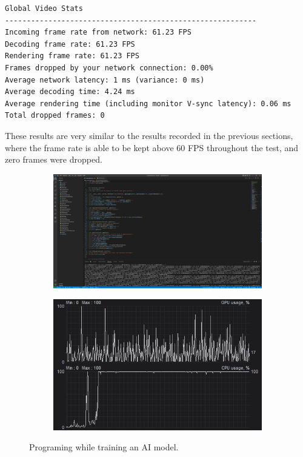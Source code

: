 \vspace{15mm} %
\begin{lstlisting}[style=plaintext,title=Statistics recorded while streaming KiCad (Figure \ref{fig:RealWorldKicad})]
Global Video Stats
----------------------------------------------------------
Incoming frame rate from network: 61.23 FPS
Decoding frame rate: 61.23 FPS
Rendering frame rate: 61.23 FPS
Frames dropped by your network connection: 0.00%
Average network latency: 1 ms (variance: 0 ms)
Average decoding time: 4.24 ms
Average rendering time (including monitor V-sync latency): 0.06 ms
Total dropped frames: 0
\end{lstlisting}

These results are very similar to the results recorded in the previous sections, where the frame rate is able to be kept above 60 FPS throughout the test, and zero frames were dropped.

\begin{figure}[t]
  \centering
  \begin{subfigure}{1\textwidth}
    \centering
    \includegraphics[width=.9\linewidth]{Figures/realworld/ai}
  \end{subfigure}
  \begin{subfigure}{1\textwidth}
    \centering
    \includegraphics[width=.5\linewidth]{Figures/realworld/aistats}
  \end{subfigure}
  \caption[Streaming the training of an AI]{Programing while training an AI model.}
  \label{fig:RealWorldAI}
\end{figure}

